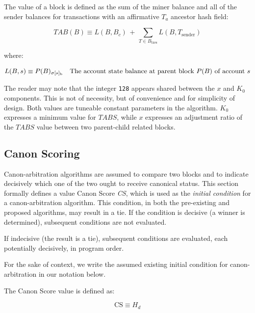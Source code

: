 \documentclass[11pt]{article}
\theoremstyle{plain}
\begin{document}
The  value of a block is defined as the sum of the miner balance
and all of the sender balances for transactions with an affirmative $T_a$
ancestor hash field:

\begin{equation}
TAB(B) \equiv L(B, B_c) \, + \, \sum_{T \in B_{\mathrm{txes}}}
L(B,T_{\mathrm{sender}})
\end{equation}

where:

\begin{equation}
L(B,s) \equiv P(B)_{\sigma[s]_{\mathrm{b}}} \quad \text{The account state
balance at parent block $P(B)$ of account $s$} \\
\end{equation}

The reader may note that the integer \texttt{128} appears shared between the
$x$ and $K_0$ components.
This is not of necessity, but of convenience and for simplicity of design.
Both values are tuneable constant parameters in the algorithm.
$K_0$ expresses a minimum value for $TABS$, while $x$ expresses an adjustment
ratio of the $TABS$ value between two parent-child related blocks.


\subsection{\small{Canon Scoring}}

Canon-arbitration algorithms are assumed to compare two blocks and to
indicate decisively which one of the two ought to receive canonical status.
This section formally defines a value Canon Score \textit{CS}, which is used as
the \textit{initial condition} for a canon-arbitration algorithm.
This condition, in both the pre-existing and proposed algorithms, may result in a tie.
If the condition is decisive (a winner is determined), subsequent
conditions are not evaluated.

If indecisive (the result is a tie), subsequent conditions are evaluated, each
potentially decisively, in program order.

For the sake of context, we write the assumed existing initial condition for
canon-arbitration in our notation below.

The Canon Score value is defined as:

\begin{equation}
\mathrm{CS} \equiv H_d
\end{equation}
\end{document}
